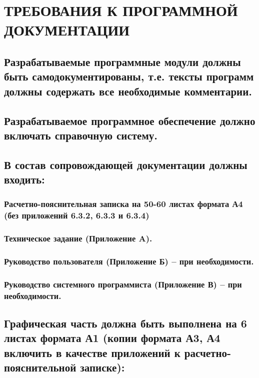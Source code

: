 \documentclass[12pt, left=30mm, right=15mm, top=20mm, bottom=20mm]{templateReportBMSTU}
\begin{document}
		
	\section{ТРЕБОВАНИЯ К ПРОГРАММНОЙ ДОКУМЕНТАЦИИ}

	\subsection{Разрабатываемые программные модули должны быть самодокументированы, т.е. тексты программ должны содержать все необходимые комментарии.}
	
	\subsection{Разрабатываемое программное обеспечение должно включать справочную систему.}
	
	\subsection{В состав сопровождающей документации должны входить:}

	\subsubsection{Расчетно-пояснительная записка на \textbf{50-60} листах формата А4 (без приложений 6.3.2, 6.3.3 и 6.3.4)} %

	\subsubsection{Техническое задание (Приложение A).}

	\subsubsection{\textbf{Руководство пользователя (Приложение Б) – при необходимости.}}

	\subsubsection{\textbf{Руководство системного программиста (Приложение В) – при необходимости.}}

	\subsection{Графическая часть должна быть выполнена на \textbf{6} листах формата А1 (копии формата А3, А4 включить в качестве приложений к расчетно-пояснительной записке):} %
\end{document}
